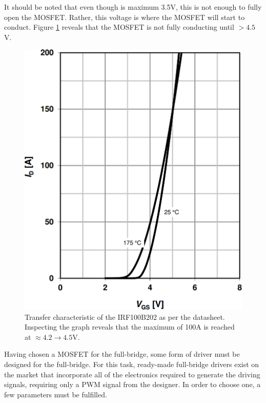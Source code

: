 It should be noted that even though \vth is maximum 3.5V, this is not enough to fully open the MOSFET.
Rather, this voltage is where the MOSFET will start to conduct.
Figure \ref{fig:mosfettransfercharacteristic} reveals that the MOSFET is not fully conducting until \vgs $>4.5$V.

\begin{figure}[H]
	\centering
	\includegraphics[width=0.6\linewidth]{graphics/mosfet_transfer_characteristic}
	\caption{Transfer characteristic of the IRF100B202 as per the datasheet.
	Inspecting the graph reveals that the maximum \id of 100A is reached at \vgs$\approx4.2\rightarrow4.5$V.}
	\label{fig:mosfettransfercharacteristic}
\end{figure}
 

Having chosen a MOSFET for the full-bridge, some form of driver must be designed for the full-bridge.
For this task, ready-made full-bridge drivers exist on the market that incorporate all of the electronics required to generate the driving signals, requiring only a PWM signal from the designer.
In order to choose one, a few parameters must be fulfilled.

